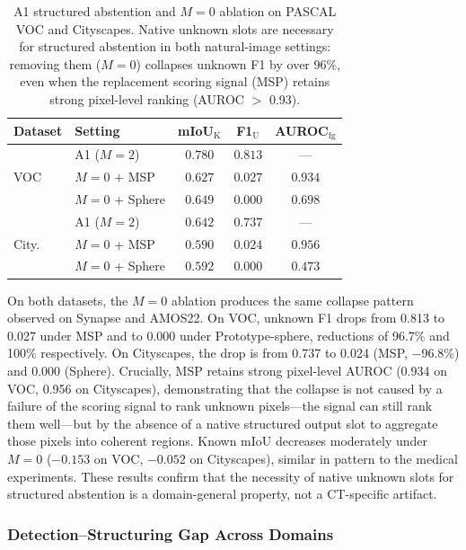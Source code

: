 \documentclass[journal]{IEEEtai}
\begin{document}
\begin{table}[!t]
\centering
\caption{A1 structured abstention and \texorpdfstring{$M{=}0$}{M=0} ablation on PASCAL VOC and Cityscapes.
Native unknown slots are necessary for structured abstention in both natural-image
settings: removing them (\texorpdfstring{$M{=}0$}{M=0}) collapses unknown F1 by over 96\%, even when the
replacement scoring signal (MSP) retains strong pixel-level ranking (AUROC \texorpdfstring{$>$}{>} 0.93).}
\label{tab:crossdomain_m0}
\scriptsize
\setlength{\tabcolsep}{3pt}
\renewcommand{\arraystretch}{0.95}
\begin{tabular}{ll ccc}
\toprule
Dataset & Setting & mIoU$_{\text{K}}$ & F1$_{\text{U}}$ & AUROC$_{\text{fg}}$ \\
\midrule
\multirow{3}{*}{VOC}
  & A1 ($M{=}2$)       & $0.780$ & $0.813$ & --- \\
  & $M{=}0$ + MSP      & $0.627$ & $0.027$ & $0.934$ \\
  & $M{=}0$ + Sphere   & $0.649$ & $0.000$ & $0.698$ \\
\midrule
\multirow{3}{*}{City.}
  & A1 ($M{=}2$)       & $0.642$ & $0.737$ & --- \\
  & $M{=}0$ + MSP      & $0.590$ & $0.024$ & $0.956$ \\
  & $M{=}0$ + Sphere   & $0.592$ & $0.000$ & $0.473$ \\
\bottomrule
\end{tabular}
\end{table}

On both datasets, the $M{=}0$ ablation produces the same collapse pattern observed
on Synapse and AMOS22.
On VOC, unknown F1 drops from 0.813 to 0.027 under MSP and to 0.000 under
Prototype-sphere, reductions of 96.7\% and 100\% respectively.
On Cityscapes, the drop is from 0.737 to 0.024 (MSP, $-$96.8\%) and 0.000 (Sphere).
Crucially, MSP retains strong pixel-level AUROC (0.934 on VOC, 0.956 on Cityscapes),
demonstrating that the collapse is not caused by a failure of the scoring signal to
rank unknown pixels---the signal can still rank them well---but by the absence of a
native structured output slot to aggregate those pixels into coherent regions.
Known mIoU decreases moderately under $M{=}0$ ($-0.153$ on VOC, $-0.052$ on
Cityscapes), similar in pattern to the medical experiments.
These results confirm that the necessity of native unknown slots for structured
abstention is a domain-general property, not a CT-specific artifact.

\subsubsection{Detection--Structuring Gap Across Domains}\label{sec:exp:crossdomain:a2}
\end{document}
